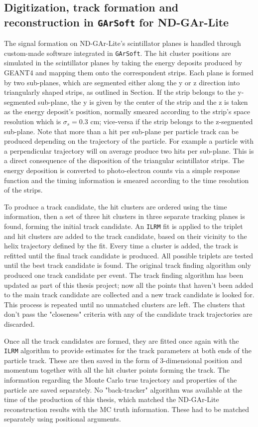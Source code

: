 \subsection{Digitization, track formation and reconstruction in \texttt{GArSoft} for ND-GAr-Lite}
The signal formation on ND-GAr-Lite's scintillator planes is handled through custom-made software integrated in \texttt{GArSoft}. The hit cluster positions are simulated in the scintillator planes by taking the energy
deposits produced by GEANT4 and mapping them onto the correspondent strips. Each plane is formed by two sub-planes, which are segmented either along the y or z direction into triangularly shaped strips, as outlined in Section. If the strip belongs to the y-segmented sub-plane, the y is given by the center of the strip and the z is taken as the energy deposit’s position, normally smeared according to the strip’s space resolution which is $\sigma_s = 0.3$ cm; vice-versa if the strip belongs to the z-segmented sub-plane. Note that more than a hit per sub-plane per particle track can be produced depending on the trajectory of the particle. For example a particle with a perpendicular trajectory will on average produce two hits per sub-plane. This is a direct consequence of the disposition of the triangular scintillator strips. The energy deposition is converted to photo-electron counts via a simple response function and the timing information is smeared according to the time resolution of the strips. 

To produce a track candidate, the hit clusters are ordered using the time information, then a set of three hit clusters in three separate tracking planes is found, forming the initial track candidate. An \texttt{ILRM} fit is applied to the triplet and hit clusters are added to the track candidate, based on their vicinity to the helix trajectory defined by the fit. Every time a cluster is added, the track is refitted until the final track candidate is produced. All possible triplets are tested until the best track candidate is found. The original track finding algorithm only produced one track candidate per event. The track finding algorithm has been updated as part of this thesis project; now all the points that haven't been added to the main track candidate are collected and a new track candidate is looked for. This process is repeated until no unmatched clusters are left. The clusters that don't pass the "closeness" criteria with any of the candidate track trajectories are discarded.

Once all the track candidates are formed, they are fitted once again with the \texttt{ILRM} algorithm to provide estimates for the track parameters at both ends of the particle track. These are then saved in the form of 3-dimensional position and momentum together with all the hit cluster points forming the track. The information regarding the Monte Carlo true trajectory and properties of the particle are saved separately. No "back-tracker" algorithm was available at the time of the production of this thesis, which matched the ND-GAr-Lite reconstruction results with the MC truth information. These had to be matched separately using positional arguments. 


